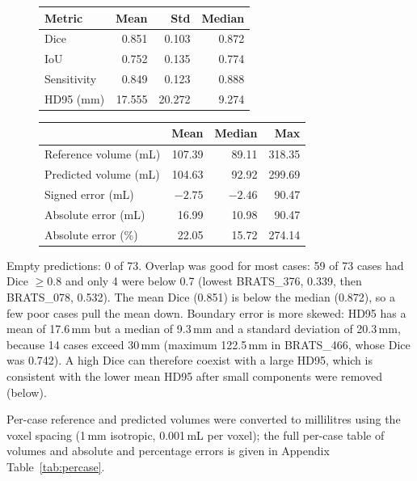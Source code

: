 \documentclass[10pt,a4paper]{article}
\begin{document}
\begin{figure}[H]
\centering
\begin{minipage}[t]{0.47\linewidth}
\centering
{}
\scriptsize
\begin{tabular}{lrrr}
\toprule
Metric & Mean & Std & Median\\
\midrule
Dice & 0.851 & 0.103 & 0.872\\
IoU & 0.752 & 0.135 & 0.774\\
Sensitivity & 0.849 & 0.123 & 0.888\\
HD95 (mm) & 17.555 & 20.272 & 9.274\\
\bottomrule
\end{tabular}
\end{minipage}\hfill
\begin{minipage}[t]{0.50\linewidth}
\centering
{}
\scriptsize
\begin{tabular}{lrrr}
\toprule
 & Mean & Median & Max\\
\midrule
Reference volume (mL) & 107.39 & 89.11 & 318.35\\
Predicted volume (mL) & 104.63 & 92.92 & 299.69\\
Signed error (mL) & $-2.75$ & $-2.46$ & 90.47\\
Absolute error (mL) & 16.99 & 10.98 & 90.47\\
Absolute error (\%) & 22.05 & 15.72 & 274.14\\
\bottomrule
\end{tabular}
\end{minipage}
\end{figure}

Empty predictions: 0 of 73. Overlap was good for most cases: 59 of 73 cases had Dice $\ge0.8$ and only 4 were below 0.7 (lowest BRATS\_376, 0.339, then BRATS\_078, 0.532). The mean Dice (0.851) is below the median (0.872), so a few poor cases pull the mean down. Boundary error is more skewed: HD95 has a mean of 17.6\,mm but a median of 9.3\,mm and a standard deviation of 20.3\,mm, because 14 cases exceed 30\,mm (maximum 122.5\,mm in BRATS\_466, whose Dice was 0.742). A high Dice can therefore coexist with a large HD95, which is consistent with the lower mean HD95 after small components were removed (below).

Per-case reference and predicted volumes were converted to millilitres using the voxel spacing (1\,mm isotropic, 0.001\,mL per voxel); the full per-case table of volumes and absolute and percentage errors is given in Appendix Table~\ref{tab:percase}.
\end{document}
